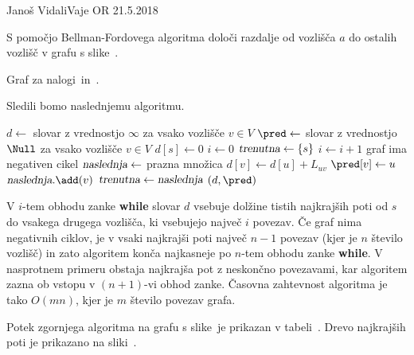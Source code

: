\begin{naloga}{Janoš Vidali}{Vaje OR 21.5.2018}
\begin{vprasanje}
S pomočjo Bellman-Fordovega algoritma
določi razdalje od vozlišča $a$ do ostalih vozlišč
v grafu s slike~\fig.

\begin{slika}
\pgfslika
\caption{Graf za nalogi~\nal in~\nal[fw].}
\end{slika}
\end{vprasanje}

\begin{odgovor}
Sledili bomo naslednjemu algoritmu.
\begin{small}
\begin{algorithmic}
    \State $d \gets$ slovar z vrednostjo $\infty$ za vsako vozlišče $v \in V$
    \State $\pred \gets$ slovar z vrednostjo $\Null$
        za vsako vozlišče $v \in V$
    \State $d[s] \gets 0$
    \State $i \gets 0$
    \State $\text{\sl trenutna} \gets \{s\}$
        \State $i \gets i+1$
            \State \Return graf ima negativen cikel
        \EndIf
        \State $\text{\sl{naslednja}} \gets$ prazna množica
                    \State $d[v] \gets d[u] + L_{uv}$
                    \State $\pred[v] \gets u$
                    \State $\text{\sl{naslednja}}.\add(v)$
                \EndIf
            \EndFor
        \EndFor
        \State $\text{\sl{trenutna}} \gets \text{\sl{naslednja}}$
    \EndWhile
    \State \Return $(d, \pred)$
\EndFunction
\end{algorithmic}
\end{small}
V $i$-tem obhodu zanke {\bf while}
slovar $d$ vsebuje dolžine tistih najkrajših poti
od $s$ do vsakega drugega vozlišča,
ki vsebujejo največ $i$ povezav.
Če graf nima negativnih ciklov,
je v vsaki najkrajši poti največ $n-1$ povezav
(kjer je $n$ število vozlišč)
in zato algoritem konča najkasneje po $n$-tem obhodu zanke {\bf while}.
V nasprotnem primeru obstaja najkrajša pot z neskončno povezavami,
kar algoritem zazna ob vstopu v $(n+1)$-vi obhod zanke.
Časovna zahtevnost algoritma je tako $O(mn)$,
kjer je $m$ število povezav grafa.

Potek zgornjega algoritma na grafu s slike~\fig je prikazan v tabeli~\tab.
Drevo najkrajših poti je prikazano na sliki~\fig[bf-resitev].


\end{odgovor}
\end{naloga}
